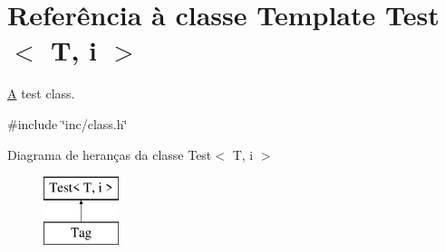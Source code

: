 \hypertarget{class_test}{\section{Referência à classe Template Test$<$ T, i $>$}
\label{class_test}
}


\hyperlink{class_a}{A} test class.  




{\ttfamily \#include \char`\"{}inc/class.\-h\char`\"{}}

Diagrama de heranças da classe Test$<$ T, i $>$\begin{figure}[H]
\begin{center}
\leavevmode
\includegraphics[height=2.000000cm]{class_test}
\end{center}
\end{figure}
